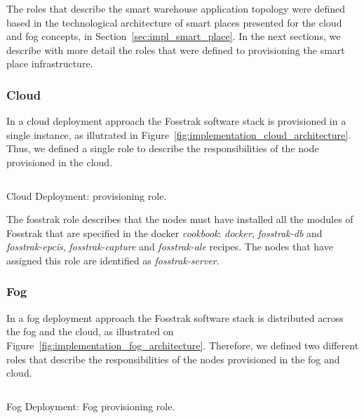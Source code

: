 The roles that describe the smart warehouse application topology were defined based in the
technological architecture of smart places presented for the cloud and fog concepts, in Section~\ref{sec:impl_smart_place}.
In the next sections, we describe with more detail the roles that were defined to provisioning the
smart place infrastructure.

\subsubsection{Cloud}
\label{sub:cloud_provisioning}
In a cloud deployment approach the Fosstrak software stack is provisioned in a single instance, as
illutrated in Figure~\ref{fig:implementation_cloud_architecture}. Thus, we defined a single role
to describe the responsibilities of the node provisioned in the cloud.\\

\begin{listing}[ht!]
  \inputminted[frame=lines,
                 framesep=3mm,
                 linenos=true,
                 xleftmargin=21pt,
                 tabsize=4]{json}{./listings/fosstrak_role.json}
  \caption{Cloud Deployment: provisioning role.}
  \label{listing:cloud_recipe}
\end{listing}

The fosstrak role describes that the nodes must have installed all the modules of Fosstrak
that are specified in the docker \textit{cookbook}: \textit{docker}, \textit{fosstrak-db} and
\textit{fosstrak-epcis}, \textit{fosstrak-capture} and \textit{fosstrak-ale} recipes. The nodes
that have assigned this role are identified as \textit{fosstrak-server}.


\subsubsection{Fog}
\label{subs:fog_provisioning}
In a fog deployment approach the Fosstrak software stack is distributed across the fog and the cloud,
as illustrated on Figure~\ref{fig:implementation_fog_architecture}. Therefore, we defined two different
roles that describe the responsibilities of the nodes provisioned in the fog and cloud.

\begin{listing}[ht!]
  \inputminted[frame=lines,
                 framesep=3mm,
                 linenos=true,
                 xleftmargin=21pt,
                 tabsize=4]{json}{./listings/fog_role.json}
  \caption{Fog Deployment: Fog provisioning role.}
  \label{listing:fog_fog_recipe}
\end{listing}

